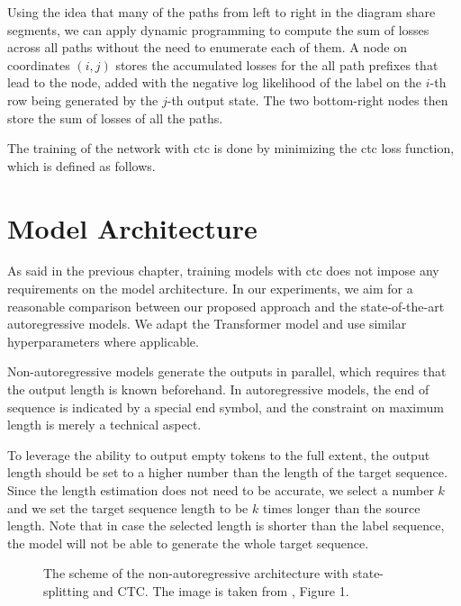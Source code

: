 Using the idea that many of the paths from left to right in the diagram share
segments, we can apply dynamic programming to compute the sum of losses across
all paths without the need to enumerate each of them. A node on coordinates
$(i,j)$ stores the accumulated losses for the all path prefixes that lead to
the node, added with the negative log likelihood of the label on the $i$-th row
being generated by the $j$-th output state. The two bottom-right nodes then
store the sum of losses of all the paths.


 The training of the network with \ac{ctc} is done by minimizing
the \ac{ctc} loss function, which is defined as follows.

\section{Model Architecture}
\label{sec:ctc:arch}

As said in the previous chapter, training models with \ac{ctc} does not impose
any requirements on the model architecture. In our experiments, we aim for a
reasonable comparison between our proposed approach and the state-of-the-art
autoregressive models. We adapt the Transformer model and use similar
hyperparameters where applicable.

Non-autoregressive models generate the outputs in parallel, which requires that
the output length is known beforehand. In autoregressive models, the end of
sequence is indicated by a special end symbol, and the constraint on maximum
length is merely a technical aspect.

To leverage the ability to output empty tokens to the full extent, the output
length should be set to a higher number than the length of the target sequence.
Since the length estimation does not need to be accurate, we select a number
$k$ and we set the target sequence length to be $k$ times longer than the
source length. Note that in case the selected length is shorter than the label
sequence, the model will not be able to generate the whole target sequence.

\begin{figure}
  \centering
  

  \caption{The scheme of the non-autoregressive architecture with
    state-splitting and CTC. The image is taken from
    \citet{libovicky-helcl-2018-end}, Figure 1.}%
  \label{fig:state-splitting}
\end{figure}



